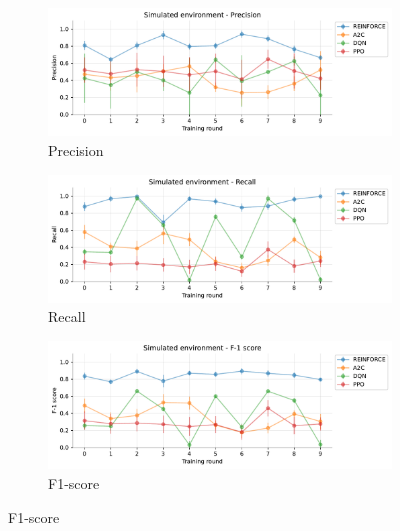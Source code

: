 \documentclass[a4paper, 12pt]{article}
\begin{document}
\begin{figure}[ht]
	\begin{subfigure}{\textwidth}
		\centering
		\includegraphics[width=\linewidth]{Simulated_Pr.pdf}  
		\caption{Precision}
		\label{fig:tr-sim-pr}
	\end{subfigure} \par\smallskip
	
	\begin{subfigure}{\textwidth}
		\centering
		\includegraphics[width=\linewidth]{Simulated_Rc.pdf}  
		\caption{Recall}
		\label{fig:tr-sim-rc}
	\end{subfigure} \par\smallskip
	
	\begin{subfigure}{\textwidth}
		\centering
		\includegraphics[width=\linewidth]{Simulated_F1.pdf}  
		\caption{F1-score}
		\label{fig:tr-sim-f1}
	\end{subfigure} \par\smallskip
	

\end{figure}
\end{document}
